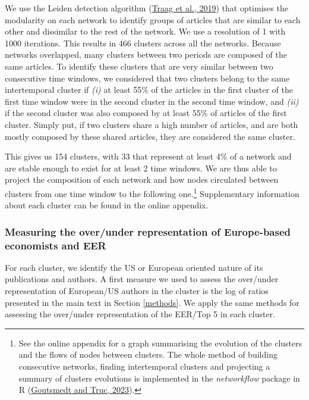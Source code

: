 \documentclass[
  12pt,
  onecolumn]{article}
\begin{document}
We use the Leiden detection algorithm (\protect\hyperlink{ref-traag2019}{Traag et al., 2019}) that optimises the modularity on each network to identify groups of articles that are similar to each other and dissimilar to the rest of the network. We use a resolution of 1 with 1000 iterations. This results in 466 clusters across all the networks. Because networks overlapped, many clusters between two periods are composed of the same articles. To identify these clusters that are very similar between two consecutive time windows, we considered that two clusters belong to the same intertemporal cluster if \emph{(i)} at least 55\% of the articles in the first cluster of the first time window were in the second cluster in the second time window, and \emph{(ii)} if the second cluster was also composed by at least 55\% of articles of the first cluster. Simply put, if two clusters share a high number of articles, and are both mostly composed by these shared articles, they are considered the same cluster.

This gives us 154 clusters, with 33 that represent at least 4\% of a network and are stable enough to exist for at least 2 time windows. We are thus able to project the composition of each network and how nodes circulated between clusters from one time window to the following one.\footnote{See the online appendix for a graph summarising the evolution of the clusters and the flows of nodes between clusters. The whole method of building consecutive networks, finding intertemporal clusters and projecting a summary of clusters evolutions is implemented in the \emph{networkflow} package in R (\protect\hyperlink{ref-goutsmedt2023a}{Goutsmedt and Truc, 2023}).} Supplementary information about each cluster can be found in the online appendix.

\hypertarget{main-index}{%
\subsubsection*{Measuring the over/under representation of Europe-based economists and EER}\label{main-index}}

For each cluster, we identify the US or European oriented nature of its publications and authors. A first measure we used to assess the over/under representation of European/US authors in the cluster is the log of ratios presented in the main text in Section \ref{methods}. We apply the same methods for assessing the over/under representation of the EER/Top 5 in each cluster.
\end{document}

